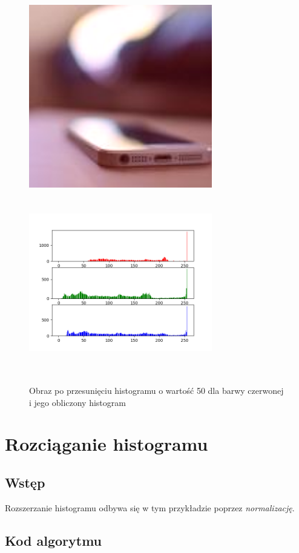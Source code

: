 \documentclass[a4paper,12pt]{book}
\begin{document}
\begin{figure}[H]
	\caption{Obraz po przesunięciu histogramu o wartość 50 dla barwy czerwonej i jego obliczony histogram}
	\includegraphics[width=8cm, height=8cm]{6-2/move-histogram-image-phone-(50,0,0).png}
	\includegraphics[width=8cm, height=8cm]{6-2/move-histogram-phone-(50,0,0).png}
\end{figure}

\section{Rozciąganie histogramu}
\subsection*{Wstęp}
Rozszerzanie histogramu odbywa się w tym przykładzie poprzez \textit{normalizację}. 

\subsection*{Kod algorytmu}
\end{document}
